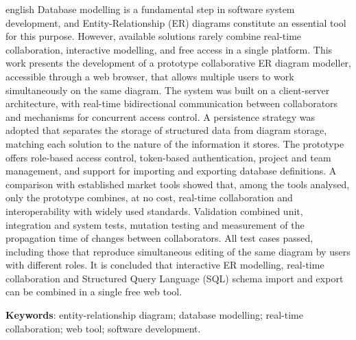 \documentclass[
	12pt,			%
	openany,		%
	oneside,		%
	a4paper,		%
	english,		%
	brazil			%
	]{abntex2}
\begin{document}
\begin{resumo}[Abstract]
\begin{otherlanguage*}{english}
Database modelling is a fundamental step in software system development, and Entity-Relationship (ER) diagrams constitute an essential tool for this purpose. However, available solutions rarely combine real-time collaboration, interactive modelling, and free access in a single platform. This work presents the development of a prototype collaborative ER diagram modeller, accessible through a web browser, that allows multiple users to work simultaneously on the same diagram. The system was built on a client-server architecture, with real-time bidirectional communication between collaborators and mechanisms for concurrent access control. A persistence strategy was adopted that separates the storage of structured data from diagram storage, matching each solution to the nature of the information it stores. The prototype offers role-based access control, token-based authentication, project and team management, and support for importing and exporting database definitions. A comparison with established market tools showed that, among the tools analysed, only the prototype combines, at no cost, real-time collaboration and interoperability with widely used standards. Validation combined unit, integration and system tests, mutation testing and measurement of the propagation time of changes between collaborators. All test cases passed, including those that reproduce simultaneous editing of the same diagram by users with different roles. It is concluded that interactive ER modelling, real-time collaboration and Structured Query Language (SQL) schema import and export can be combined in a single free web tool.

\textbf{Keywords}: entity-relationship diagram; database modelling; real-time collaboration; web tool; software development.
 \end{otherlanguage*}
\end{resumo}


\listoffigures
\cleardoublepage

\listoftables
\cleardoublepage
{}
\end{document}
